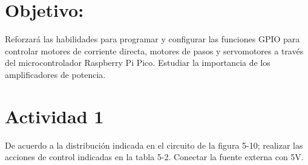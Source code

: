 \documentclass[letterpaper,12pt]{article}
\begin{document}
    

    \newpage
    \setcounter{page}{1}

    \section{Objetivo:}
    
    Reforzará las habilidades para programar y configurar las funciones GPIO para controlar
    motores de corriente directa, motores de pasos y servomotores a través del microcontrolador
    Raspberry Pi Pico. Estudiar la importancia de los amplificadores de potencia.
    
    \section*{Actividad 1}
    
    De acuerdo a la distribución indicada en el circuito de la figura 5-10; realizar las acciones
    de control indicadas en la tabla 5-2. Conectar la fuente externa con 5V.
\end{document}
